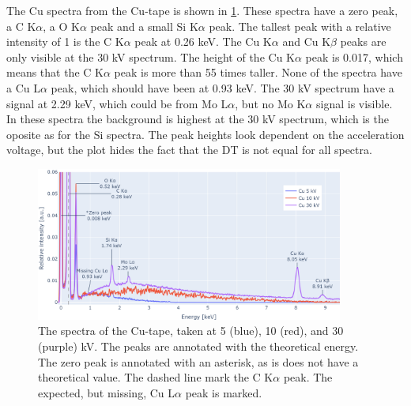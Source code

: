 The Cu spectra from the Cu-tape is shown in \cref{fig:results:Spectra_Cu}.
These spectra have a zero peak, a C K$\alpha$, a O K$\alpha$ peak and a small Si K$\alpha$ peak.
The tallest peak with a relative intensity of 1 is the C K$\alpha$ peak at 0.26 keV.
The Cu K$\alpha$ and Cu K$\beta$ peaks are only visible at the 30 kV spectrum.
The height of the Cu K$\alpha$ peak is 0.017, which means that the C K$\alpha$ peak is more than 55 times taller.
None of the spectra have a Cu L$\alpha$ peak, which should have been at 0.93 keV.
The 30 kV spectrum have a signal at 2.29 keV, which could be from Mo L$\alpha$, but no Mo K$\alpha$ signal is visible.
In these spectra the background is highest at the 30 kV spectrum, which is the oposite as for the Si spectra.
The peak heights look dependent on the acceleration voltage, but the plot hides the fact that the DT is not equal for all spectra.


\begin{figure}[h]
    \centering
    \includegraphics[width=0.90\textwidth]{figures/each_spectra/Cu_everything.png}
    \caption{
        The spectra of the Cu-tape, taken at 5 (blue), 10 (red), and 30 (purple) kV.
        The peaks are annotated with the theoretical energy.
        The zero peak is annotated with an asterisk, as is does not have a theoretical value.
        The dashed line mark the C K$\alpha$ peak.
        The expected, but missing, Cu L$\alpha$ peak is marked.
    }
    \label{fig:results:Spectra_Cu}
\end{figure}

